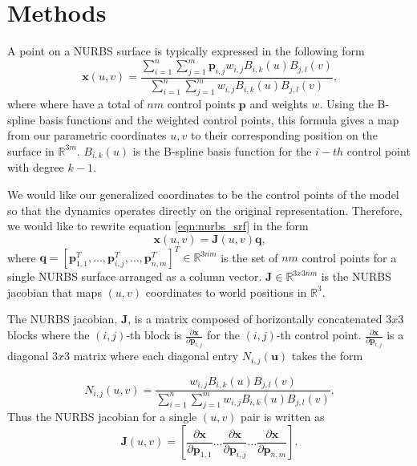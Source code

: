 \section{Methods}


A point on a NURBS surface is typically expressed in the following form
\begin{equation}
\label{eqn:nurbs_srf}
    \mathbf{x}(u,v) = \frac{\sum_{i=1}^{n}\sum_{j=1}^{m}  \mathbf{p}_{i,j} w_{i,j} B_{i,k}(u)B_{j,l}(v)}
    {\sum_{i=1}^{n}\sum_{j=1}^{m} w_{i,j} B_{i,k}(u)B_{j,l}(v)}
    \text{,}
\end{equation}
where where have a total of $nm$ control points $\mathbf{p}$ and weights $w$. Using the B-spline basis functions and the weighted control points, this formula gives a map from our parametric coordinates $u,v$ to their corresponding position on the surface in $\mathbb{R}^{3m}$. $B_{i,k}(u)$ is the B-spline basis function for the $i-th$ control point with degree $k-1$.

We would like our generalized coordinates to be the control points of the model so that the dynamics operates directly on the original representation. Therefore, we would like to rewrite equation \ref{eqn:nurbs_srf} in the form
\begin{equation}
    \mathbf{x}(u,v) = \mathbf{J}(u,v)\mathbf{q}
    \text{,}
\end{equation}
where $\mathbf{q} = \left[ \mathbf{p}_{1,1}^T, \dots, \mathbf{p}_{i,j}^T, \dots, \mathbf{p}_{n,m}^T \right]^T \in \mathbb{R}^{3nm}$ is the set of $nm$ control points  for a single NURBS surface arranged as a column vector. $\mathbf{J} \in  \mathbb{R}^{3 x 3nm}$ is the NURBS jacobian that maps $(u,v)$ coordinates to world positions in $\mathbb{R}^{3}$.

The NURBS jacobian, $\mathbf{J}$, is a matrix composed of horizontally concatenated $3x3$ blocks where the $(i,j)$-th block is $\frac{\partial \mathbf{x}}{\partial \mathbf{p}_{i,j}}$ for the $(i,j)$-th control point. $\frac{\partial \mathbf{x}}{\partial \mathbf{p}_{i,j}}$ is a diagonal $3x3$ matrix where each diagonal entry $N_{i,j}(\mathbf{u})$ takes the form

\begin{equation}
\label{eqn:jacobian_diagonal}
    N_{i,j}(u,v)
    = \frac{w_{i,j} B_{i,k}(u)B_{j,l}(v)}{\sum_{i=1}^{n}\sum_{j=1}^{m} w_{i,j} B_{i,k}(u)B_{j,l}(v)}
    \text{.}
\end{equation}
Thus the NURBS jacobian for a single $(u,v)$ pair is written as
\begin{equation}
\label{eqn:uv_jacobian}
    \mathbf{J}(u,v) =
    \left[ \frac{\partial \mathbf{x}}{\partial \mathbf{p}_{1,1}} \dots
           \frac{\partial \mathbf{x}}{\partial \mathbf{p}_{i,j}} \dots 
           \frac{\partial \mathbf{x}}{\partial \mathbf{p}_{n,m}}
    \right]
    \text{.}
\end{equation}

